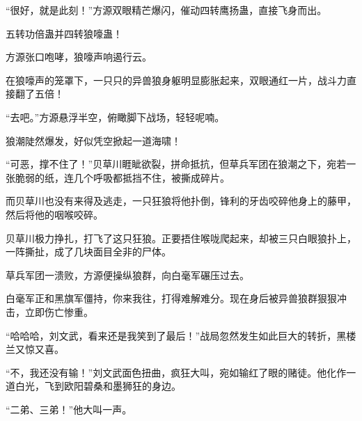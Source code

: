 \begin{this_body}
“很好，就是此刻！”方源双眼精芒爆闪，催动四转鹰扬蛊，直接飞身而出。

五转功倍蛊并四转狼嚎蛊！

方源张口咆哮，狼嚎声响遏行云。

在狼嚎声的笼罩下，一只只的异兽狼身躯明显膨胀起来，双眼通红一片，战斗力直接翻了五倍！

“去吧。”方源悬浮半空，俯瞰脚下战场，轻轻呢喃。

狼潮陡然爆发，好似凭空掀起一道海啸！

“可恶，撑不住了！”贝草川睚眦欲裂，拼命抵抗，但草兵军团在狼潮之下，宛若一张脆弱的纸，连几个呼吸都抵挡不住，被撕成碎片。

而贝草川也没有来得及逃走，一只狂狼将他扑倒，锋利的牙齿咬碎他身上的藤甲，然后将他的咽喉咬碎。

贝草川极力挣扎，打飞了这只狂狼。正要捂住喉咙爬起来，却被三只白眼狼扑上，一阵撕扯，成了几块面目全非的尸体。

草兵军团一溃败，方源便操纵狼群，向白毫军碾压过去。

白毫军正和黑旗军僵持，你来我往，打得难解难分。现在身后被异兽狼群狠狠冲击，立即伤亡惨重。

“哈哈哈，刘文武，看来还是我笑到了最后！”战局忽然发生如此巨大的转折，黑楼兰又惊又喜。

“不，我还没有输！”刘文武面色扭曲，疯狂大叫，宛如输红了眼的赌徒。他化作一道白光，飞到欧阳碧桑和墨狮狂的身边。

“二弟、三弟！”他大叫一声。

\end{this_body}

